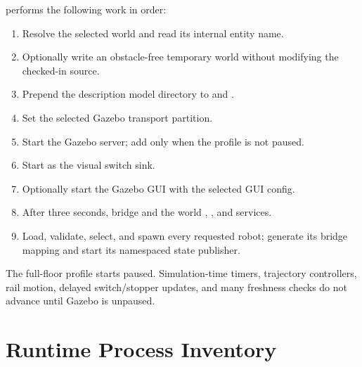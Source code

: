  performs the
following work in order:

\begin{enumerate}
  \item Resolve the selected world and read its internal entity name.
  \item Optionally write an obstacle-free temporary world without modifying the
        checked-in source.
  \item Prepend the description model directory to
         and .
  \item Set the selected Gazebo transport partition.
  \item Start the Gazebo server; add  only when the profile is not paused.
  \item Start 
        as the visual switch sink.
  \item Optionally start the Gazebo GUI with the selected GUI config.
  \item After three seconds, bridge  and the world
        , , and  services.
  \item Load, validate, select, and spawn every requested robot; generate its
        bridge mapping and start its namespaced state publisher.
\end{enumerate}

The full-floor profile starts paused. Simulation-time timers, trajectory
controllers, rail motion, delayed switch/stopper updates, and many freshness
checks do not advance until Gazebo is unpaused.

\section{Runtime Process Inventory}

